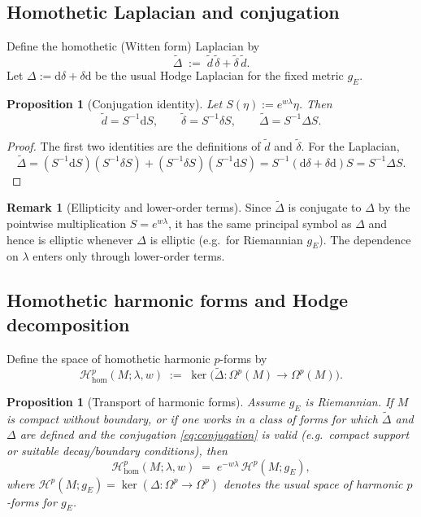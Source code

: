 \documentclass[preprint,12pt]{elsarticle}
\theoremstyle{plain}
\newtheorem{proposition}[theorem]{Proposition}
\theoremstyle{definition}
\newtheorem{remark}[theorem]{Remark}
\theoremstyle{note}
\newcommand{\dd}{\mathrm{d}}
\newcommand{\wtd}{\tilde d}
\newcommand{\wtdel}{\tilde\delta}
\newcommand{\wtD}{\tilde\Delta}
\begin{document}
\subsection{Homothetic Laplacian and conjugation}
Define the homothetic (Witten form) Laplacian by
\begin{equation}\label{eq:tilde-laplacian}
\wtD \;:=\; \wtd\,\wtdel+\wtdel\,\wtd.
\end{equation}
Let $\Delta:=\dd\delta+\delta\dd$ be the usual Hodge Laplacian for the fixed metric $g_E$.

\begin{proposition}[Conjugation identity]\label{prop:conjugation}
Let $S(\eta):=e^{w\lambda}\eta$.
Then
\begin{equation}\label{eq:conjugation}
\wtd = S^{-1}\dd S,\qquad
\wtdel = S^{-1}\delta S,\qquad
\wtD = S^{-1}\Delta S.
\end{equation}
\end{proposition}

\begin{proof}
The first two identities are the definitions of $\wtd$ and $\wtdel$.
For the Laplacian,
\[
\wtD
= (S^{-1}\dd S)(S^{-1}\delta S) + (S^{-1}\delta S)(S^{-1}\dd S)
= S^{-1}(\dd\delta+\delta\dd)S
= S^{-1}\Delta S.
\]
\end{proof}

\begin{remark}[Ellipticity and lower-order terms]\label{rem:elliptic}
Since $\wtD$ is conjugate to $\Delta$ by the pointwise multiplication $S=e^{w\lambda}$, it has the same principal symbol as $\Delta$ and hence is elliptic whenever $\Delta$ is elliptic (e.g.\ for Riemannian $g_E$). The dependence on $\lambda$ enters only through lower-order terms.
\end{remark}

\subsection{Homothetic harmonic forms and Hodge decomposition}
Define the space of homothetic harmonic $p$-forms by
\begin{equation}\label{eq:hom-harmonic}
\mathcal{H}^p_{\mathrm{hom}}(M;\lambda,w)
\;:=\;
\ker\big(\wtD:\Omega^p(M)\to\Omega^p(M)\big).
\end{equation}

\begin{proposition}[Transport of harmonic forms]\label{prop:harmonic-transport}
Assume $g_E$ is Riemannian. If $M$ is compact without boundary, or if one works in a class of forms for which $\wtD$ and $\Delta$ are defined and the conjugation \eqref{eq:conjugation} is valid (e.g.\ compact support or suitable decay/boundary conditions), then
\begin{equation}\label{eq:harmonic-transport}
\mathcal{H}^p_{\mathrm{hom}}(M;\lambda,w)
\;=\;
e^{-w\lambda}\,\mathcal{H}^p(M;g_E),
\end{equation}
where $\mathcal{H}^p(M;g_E)=\ker(\Delta:\Omega^p\to\Omega^p)$ denotes the usual space of harmonic $p$-forms for $g_E$.
\end{proposition}
\end{document}

